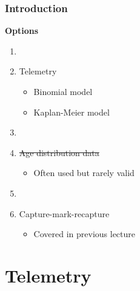 \documentclass[color=usenames,dvipsnames]{beamer}\usepackage[]{graphicx}\usepackage[]{color}
\begin{document}
\begin{frame}
  \frametitle{Introduction}
  \Large %
  {\bf Options}
  \begin{enumerate}[\bf (1)]
    \large
    \item[]
    \item Telemetry
      \begin{itemize}
        \large
        \item Binomial model
        \item Kaplan-Meier model
      \end{itemize}
    \item[]
    \item<2-> \st{Age distribution data}
      \begin{itemize}
        \item Often used but rarely valid
      \end{itemize}
    \item[]
    \item<3-> Capture-mark-recapture
      \begin{itemize}
        \item Covered in previous lecture %
      \end{itemize}
  \end{enumerate}
\end{frame}




\section{Telemetry}



\end{document}
